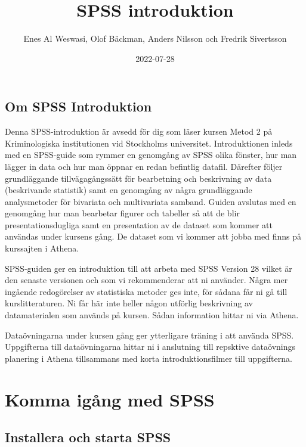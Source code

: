 \documentclass[
]{book}
\title{SPSS introduktion}
\author{Enes Al Weswasi, Olof Bäckman, Anders Nilsson och Fredrik Sivertsson}
\date{2022-07-28}
\begin{document}
\maketitle

{
\hypersetup{linkcolor=}
\setcounter{tocdepth}{1}
\tableofcontents
}
\hypertarget{om-spss-introduktion}{%
\chapter*{Om SPSS Introduktion}\label{om-spss-introduktion}}

Denna SPSS-introduktion är avsedd för dig som läser kursen Metod 2 på Kriminologiska institutionen vid Stockholms universitet. Introduktionen inleds med en SPSS-guide som rymmer en genomgång av SPSS olika fönster, hur man lägger in data och hur man öppnar en redan befintlig datafil. Därefter följer grundläggande tillvägagångssätt för bearbetning och beskrivning av data (beskrivande statistik) samt en genomgång av några grundläggande analysmetoder för bivariata och multivariata samband. Guiden avslutas med en genomgång hur man bearbetar figurer och tabeller så att de blir presentationsdugliga samt en presentation av de dataset som kommer att användas under kursens gång. De dataset som vi kommer att jobba med finns på kurssajten i Athena.

SPSS-guiden ger en introduktion till att arbeta med SPSS Version 28 vilket är den senaste versionen och som vi rekommenderar att ni använder. Några mer ingående redogörelser av statistiska metoder ges inte, för sådana får ni gå till kurslitteraturen. Ni får här inte heller någon utförlig beskrivning av datamaterialen som används på kursen. Sådan information hittar ni via Athena.

Dataövningarna under kursen gång ger ytterligare träning i att använda SPSS. Uppgifterna till dataövningarna hittar ni i anslutning till repsktive dataövnings planering i Athena tillsammans med korta introduktionsfilmer till uppgifterna.

\hypertarget{part-komma-iguxe5ng-med-spss}{%
\part*{Komma igång med SPSS}\label{part-komma-iguxe5ng-med-spss}}

\hypertarget{installera-och-starta-spss}{%
\chapter{Installera och starta SPSS}\label{installera-och-starta-spss}}
\end{document}

